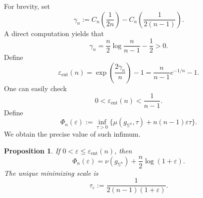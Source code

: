 \documentclass[11pt, reqno]{amsart}
\numberwithin{equation}{section}
\newtheorem{proposition}[theorem]{Proposition}
\theoremstyle{remark}
\newcommand{\Sph}{\mathbb S}
\newcommand{\eps}{\varepsilon}
\newcommand{\ent}{\mathrm{ent}}
\begin{document}
For brevity, set 
\begin{equation}\label{eq:gamma}
\gamma_n:=C_n\left(\frac{1}{2n}\right)-C_n\left(\frac{1}{2(n-1)}\right).
\end{equation}
A direct computation yields that 
\begin{equation}\label{eq:gamma+}\gamma_n=\frac n2\log\frac n{n-1}-\frac12>0.\end{equation}
Define \begin{equation}\label{eq:eps-ent}
\eps_{\ent}(n)
=\exp\left(\frac{2\gamma_n}{n}\right)-1
=\frac n{n-1}e^{-1/n}-1.
\end{equation}
One can easily check  
 \begin{equation}\label{eq:eps-ent-upper}
0<\eps_{\ent}(n)<\frac{1}{n-1}.\end{equation}
Define 
\begin{equation}\label{eq:Phi}
\Phi_n(\eps):=\inf_{\tau>0}
\{\mu(g_{\Sph^n},\tau)+n(n-1)\eps\tau\}.
\end{equation}
We obtain the precise value of such infimum.
\begin{proposition}
\label{prop:tilted-minimum}
If $0<\eps\leq\eps_{\ent}(n)$, then
\begin{equation}\label{eq:Phi-value}
\Phi_n(\eps)=\nu(g_{\Sph^n})+\frac n2\log(1+\eps).
\end{equation}
The unique minimizing scale is
\begin{equation}\label{eq:tau-eps}
\tau_\eps:=\frac1{2(n-1)(1+\eps)}.
\end{equation}
\end{proposition}
\end{document}
